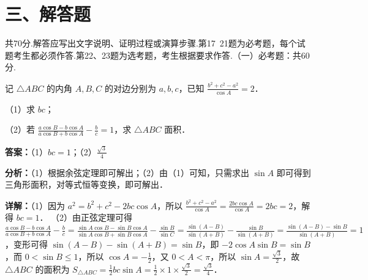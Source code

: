 \section*{三、解答题}
共70分.解答应写出文字说明、证明过程或演算步骤.第17~21题为必考题，每个试题考生都必须作答.第22、23题为选考题，考生根据要求作答.（一）必考题：共60分.

\begin{question}
记 $\triangle ABC$ 的内角 $A,B,C$ 的对边分别为 $a,b,c$，已知 $\frac{b^2+c^2-a^2}{\cos A}=2$．

（1）求 $bc$；

（2）若 $\frac{a\cos B-b\cos A}{a\cos B+b\cos A}-\frac{b}{c}=1$，求 $\triangle ABC$ 面积．
\begin{solution}
\textbf{答案：}（1）$bc=1$；（2）$\frac{\sqrt{3}}{4}$

\textbf{分析：}（1）根据余弦定理即可解出；（2）由（1）可知，只需求出 $\sin A$ 即可得到三角形面积，对等式恒等变换，即可解出．

\textbf{详解：}（1）因为 $a^2=b^2+c^2-2bc\cos A$，所以 $\frac{b^2+c^2-a^2}{\cos A}=\frac{2bc\cos A}{\cos A}=2bc=2$，解得 $bc=1$．
（2）由正弦定理可得 $\frac{a\cos B-b\cos A}{a\cos B+b\cos A}-\frac{b}{c}=\frac{\sin A\cos B-\sin B\cos A}{\sin A\cos B+\sin B\cos A}-\frac{\sin B}{\sin C}=\frac{\sin(A-B)}{\sin(A+B)}-\frac{\sin B}{\sin(A+B)}=\frac{\sin(A-B)-\sin B}{\sin(A+B)}=1$，变形可得 $\sin(A-B)-\sin(A+B)=\sin B$，即 $-2\cos A\sin B=\sin B$，而 $0<\sin B\le1$，所以 $\cos A=-\frac{1}{2}$，又 $0<A<\pi$，所以 $\sin A=\frac{\sqrt{3}}{2}$，故 $\triangle ABC$ 的面积为 $S_{\triangle ABC}=\frac{1}{2}bc\sin A=\frac{1}{2}\times1\times\frac{\sqrt{3}}{2}=\frac{\sqrt{3}}{4}$．
\end{solution}
\end{question}

